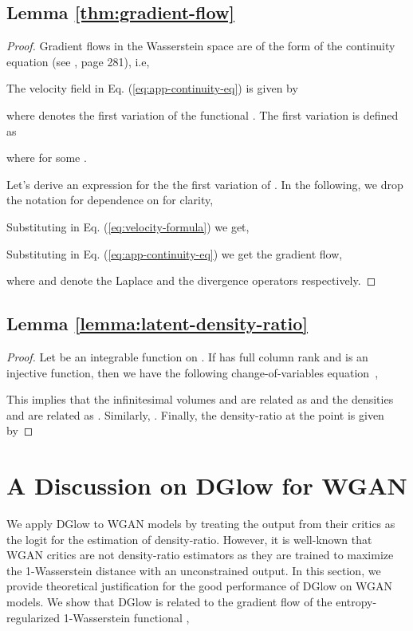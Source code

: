 \documentclass{article} \usepackage{iclr2021_conference,times}
\newcommand{\ourmethod}{\textsc{DG}low}
\begin{document}
\subsection{Lemma \ref{thm:gradient-flow}}
\label{subsec:proof_gradient-flow}
\begin{proof}
	Gradient flows in the Wasserstein space are of the form of the continuity equation (see \citet{ambrosio2008gradient}, page 281), i.e,
	
	
The velocity field  in Eq. (\ref{eq:app-continuity-eq}) is given by
	
	where  denotes the first variation of the functional . The first variation is defined as
	
where  for some .

Let's derive an expression for the the first variation of . In the following, we drop the notation for dependence on  for clarity,

	
	
Substituting  in Eq. (\ref{eq:velocity-formula}) we get,
	
	Substituting  in Eq. (\ref{eq:app-continuity-eq}) we get  the gradient flow, 
	
	
	where  and  denote the Laplace and the divergence operators respectively.
\end{proof}

\subsection{Lemma \ref{lemma:latent-density-ratio}}
\label{subsec:proof_densityratio}
\begin{proof}
	Let  be an integrable function on . If  has full column rank and  is an injective function, then we have the following change-of-variables equation~\citep{ben1999change,gemici2016normalizing},
	
	This implies that the infinitesimal volumes  and  are related as  and the densities  and  are related as .
	 Similarly, . Finally, the density-ratio  at the point  is given by
	 
\end{proof}

\section{A Discussion on \ourmethod{} for WGAN}
\label{sec:wgan-discussion}
We apply \ourmethod{} to WGAN models by treating the output from their critics as the logit for the estimation of density-ratio. However, it is well-known that WGAN critics are not density-ratio estimators as they are trained to maximize the 1-Wasserstein distance with an unconstrained output. In this section, we provide theoretical justification for the good performance of \ourmethod{} on WGAN models. We show that \ourmethod{} is related to the gradient flow of the entropy-regularized 1-Wasserstein functional ,
	
\end{document}
